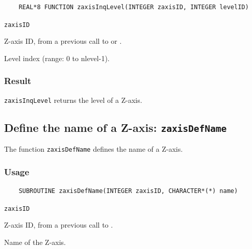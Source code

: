 \begin{verbatim}
    REAL*8 FUNCTION zaxisInqLevel(INTEGER zaxisID, INTEGER levelID)
\end{verbatim}

\hspace*{4mm}\begin{minipage}[]{15cm}
\begin{deflist}{\texttt{zaxisID}\ }
\item[\texttt{zaxisID}]
Z-axis ID, from a previous call to {} or {}.
\item[\texttt{levelID}]
Level index (range: 0 to nlevel-1).

\end{deflist}
\end{minipage}

\subsubsection*{Result}

{\texttt{zaxisInqLevel}} returns the level of a Z-axis.


\subsection{Define the name of a Z-axis: \texttt{zaxisDefName}}
\label{zaxisDefName}

The function {\texttt{zaxisDefName}} defines the name of a Z-axis.

\subsubsection*{Usage}

\begin{verbatim}
    SUBROUTINE zaxisDefName(INTEGER zaxisID, CHARACTER*(*) name)
\end{verbatim}

\hspace*{4mm}\begin{minipage}[]{15cm}
\begin{deflist}{\texttt{zaxisID}\ }
\item[\texttt{zaxisID}]
Z-axis ID, from a previous call to {}.
\item[\texttt{name}]
Name of the Z-axis.

\end{deflist}
\end{minipage}


